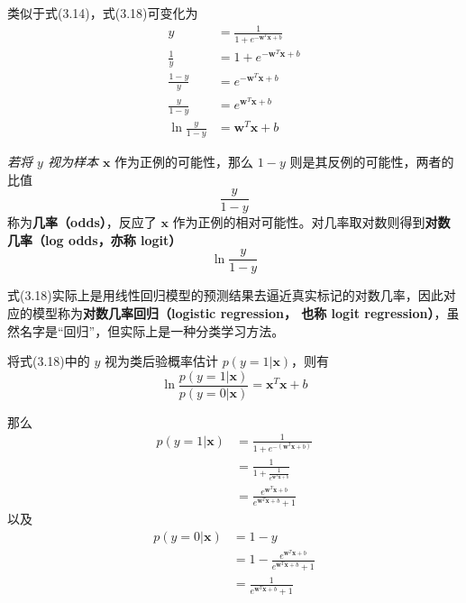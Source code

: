 \documentclass[../studies-ml.tex]{subfiles}
\begin{document}
类似于式(3.14)，式(3.18)可变化为
\begin{equation}
  \begin{split}
    y & = \frac{1}{1 + e^{-\pmb{w}^T\pmb{x}+b}} \\
    \frac{1}{y} & = 1 + e^{-\pmb{w}^T\pmb{x}+b} \\
    \frac{1-y}{y} & = e^{-\pmb{w}^T\pmb{x}+b} \\
    \frac{y}{1-y} & = e^{\pmb{w}^T\pmb{x}+b} \\
    \ln\frac{y}{1-y} & = \pmb{w}^T\pmb{x}+b
  \end{split}
\end{equation}

\textit{若将 $y$ 视为样本 $\pmb{x}$} 作为正例的可能性，那么 $1-y$ 则是其反例的可能性，两者的比值
\begin{equation}
  \frac{y}{1-y}
\end{equation}
称为\textbf{几率（odds）}，反应了 $\pmb{x}$ 作为正例的相对可能性。对几率取对数则得到\textbf{对数几率（log odds，亦称 logit）}
\begin{equation}
  \ln\frac{y}{1-y}
\end{equation}

式(3.18)实际上是用线性回归模型的预测结果去逼近真实标记的对数几率，因此对应的模型称为\textbf{对数几率回归（logistic regression，
  也称 logit regression）}，虽然名字是“回归”，但实际上是一种分类学习方法。

将式(3.18)中的 $y$ 视为类后验概率估计 $p(y=1|\pmb{x})$，则有
\begin{equation}
  \ln\frac{p(y=1|\pmb{x})}{p(y=0|\pmb{x})} = \pmb{x}^T \pmb{x} + b
\end{equation}

那么
\begin{equation}
  \begin{split}
    p(y=1|\pmb{x}) & = \frac{1}{1+e^{-(\pmb{w}^T\pmb{x}+b)}} \\
    & = \frac{1}{1+\frac{1}{e^{\pmb{w}^T\pmb{x}+b}}} \\
    & = \frac{e^{\pmb{w}^T\pmb{x}+b}}{e^{\pmb{w}^T\pmb{x}+b} + 1}
  \end{split}
\end{equation}
以及
\begin{equation}
  \begin{split}
    p(y=0|\pmb{x}) & = 1 - y \\
    & = 1 - \frac{e^{\pmb{w}^T\pmb{x}+b}}{e^{\pmb{w}^T\pmb{x}+b} + 1} \\
    & = \frac{1}{e^{\pmb{w}^T\pmb{x}+b} + 1}
  \end{split}
\end{equation}
\end{document}
